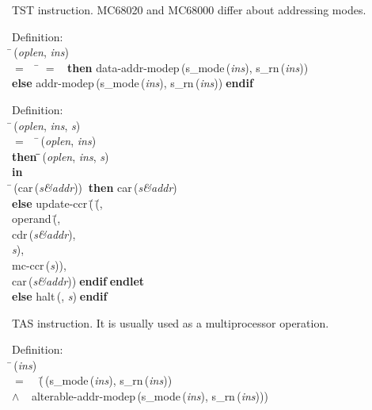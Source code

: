  TST instruction.
 MC68020 and MC68000 differ about addressing modes.
\begin{tabbing}{\sc Definition}: \\  
\=\,({\it{oplen\/}}, {\it{ins\/}}) \\ 
$=$$\;\;\;\;$\= $=$ {}$\;\;${\bf then }{\rm{data-addr-modep}}\,({\rm{s\_mode}}\,({\it{ins\/}}), {\rm{s\_rn}}\,({\it{ins\/}})) \\ 
{\bf else }{\rm{addr-modep}}\,({\rm{s\_mode}}\,({\it{ins\/}}), {\rm{s\_rn}}\,({\it{ins\/}}))$\;${\bf  endif}\-\-
\end{tabbing}

\begin{tabbing}{\sc Definition}: \\  
\=\,({\it{oplen\/}}, {\it{ins\/}}, {\it{s\/}}) \\ 
$=$$\;\;\;\;$\=\,({\it{oplen\/}}, {\it{ins\/}}) \\ 
{\bf then }\=\=\,({\it{oplen\/}}, {\it{ins\/}}, {\it{s\/}})\- \\ 
{\bf in} \\ 
\=\,({\rm{car}}\,({\it{s\&addr\/}}))$\;\;${\bf then }{\rm{car}}\,({\it{s\&addr\/}}) \\ 
{\bf else }{\rm{update-ccr}}\,(\=\,(\=, \\ 
{\rm{operand}}\,(\=, \\ 
{\rm{cdr}}\,({\it{s\&addr\/}}), \\ 
{\it{s\/}})\-, \\ 
{\rm{mc-ccr}}\,({\it{s\/}}))\-, \\ 
{\rm{car}}\,({\it{s\&addr\/}}))\-$\;${\bf  endif}\-$\;${\bf  endlet}\- \\ 
{\bf else }{\rm{halt}}\,({}, {\it{s\/}})$\;${\bf  endif}\-\-
\end{tabbing}

 TAS instruction.
 It is usually used as a multiprocessor operation. 
\begin{tabbing}{\sc Definition}: \\  
\=\,({\it{ins\/}}) \\ 
$=$$\;\;\;\;$(\=\,({\rm{s\_mode}}\,({\it{ins\/}}), {\rm{s\_rn}}\,({\it{ins\/}})) \\ 
$\wedge$$\;\;\;\;${\rm{alterable-addr-modep}}\,({\rm{s\_mode}}\,({\it{ins\/}}), {\rm{s\_rn}}\,({\it{ins\/}})))\-\-
\end{tabbing}

